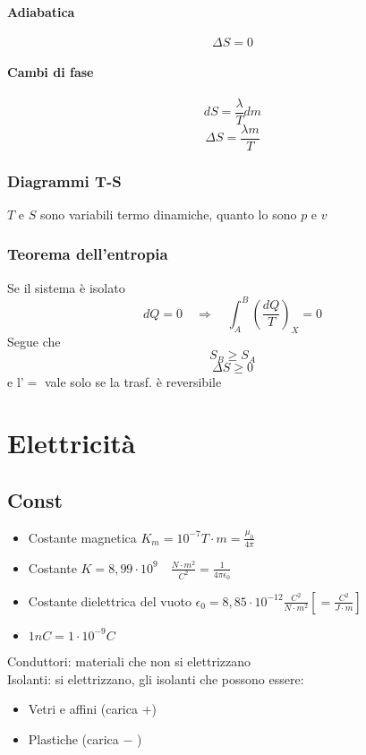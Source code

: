 \documentclass[a4paper]{report}
\begin{document}
  \subsubsection{Adiabatica}
  $$ \Delta S = 0 $$

  \subsubsection{Cambi di fase}
  $$ dS = \frac{\lambda}{T} dm$$
  $$ \Delta S = \frac{\lambda m}{T} $$

  \subsection{Diagrammi T-S}
  $T$ e $S$ sono variabili termo dinamiche, quanto lo sono $p$ e $v$
  \subsection{Teorema dell'entropia}
  Se il sistema è isolato
  $$ dQ = 0 \quad \Rightarrow \quad \int_A^B(\frac{dQ}{T})_X = 0$$
  Segue che
  $$ S_B \geq S_A $$
  $$ \Delta S \geq 0 $$
  e l'$=$ vale solo se la trasf. è reversibile

  \chapter{Elettricità}
  \section{Const}
  \begin{itemize}
    \item Costante magnetica $K_m = 10^{-7} T\cdot m = \frac{\mu_0}{4\pi}$
    \item Costante $K = 8,99 \cdot 10^9 \quad \frac{N\cdot m^2}{C^2} = \frac{1}{4\pi \epsilon_0}$
    \item Costante dielettrica del vuoto $\epsilon_0 = 8,85 \cdot 10^{-12} \frac{C^2}{N \cdot m^2} [= \frac{C^2}{J \cdot m}]$
    \item $1nC = 1 \cdot 10^{-9} C $
  \end{itemize}
  Conduttori: materiali che non si elettrizzano \\
  Isolanti: si elettrizzano, gli isolanti che possono essere:
  \begin{itemize}
    \item Vetri e affini (carica $+$)
    \item Plastiche (carica $-$ )
  \end{itemize}
\end{document}
